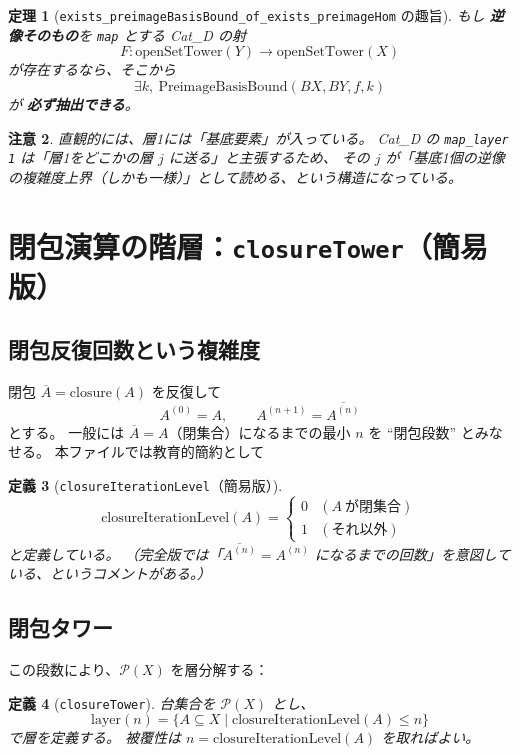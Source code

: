 \documentclass[a4paper,11pt]{article}
\newtheorem{definition}{定義}[section]
\newtheorem{theorem}[definition]{定理}
\newtheorem{remark}[definition]{注意}
\begin{document}
\begin{theorem}[\texttt{exists\_preimageBasisBound\_of\_exists\_preimageHom} の趣旨]
もし \textbf{逆像そのもの}を \texttt{map} とする Cat\_D の射
\[
F:\mathrm{openSetTower}(Y)\to \mathrm{openSetTower}(X)
\]
が存在するなら、そこから
\[
\exists k,\ \mathrm{PreimageBasisBound}(BX,BY,f,k)
\]
が \textbf{必ず抽出できる}。
\end{theorem}

\begin{remark}
直観的には、層1には「基底要素」が入っている。
Cat\_D の \texttt{map\_layer 1} は「層1をどこかの層 $j$ に送る」と主張するため、
その $j$ が「基底1個の逆像の複雑度上界（しかも一様）」として読める、という構造になっている。
\end{remark}

\section{閉包演算の階層：\texttt{closureTower}（簡易版）}

\subsection{閉包反復回数という複雑度}
閉包 $\overline{A}=\mathrm{closure}(A)$ を反復して
\[
A^{(0)}=A,\qquad A^{(n+1)}=\overline{A^{(n)}}
\]
とする。
一般には $\overline{A}=A$（閉集合）になるまでの最小 $n$ を ``閉包段数'' とみなせる。
本ファイルでは教育的簡約として

\begin{definition}[\texttt{closureIterationLevel}（簡易版）]
\[
\mathrm{closureIterationLevel}(A)=
\begin{cases}
0 & (A\ \text{が閉集合})\\
1 & (\text{それ以外})
\end{cases}
\]
と定義している。
（完全版では「$\overline{A^{(n)}}=A^{(n)}$ になるまでの回数」を意図している、というコメントがある。）
\end{definition}

\subsection{閉包タワー}
この段数により、$\mathcal{P}(X)$ を層分解する：

\begin{definition}[\texttt{closureTower}]
台集合を $\mathcal{P}(X)$ とし、
\[
\mathrm{layer}(n)=\{A\subseteq X\mid \mathrm{closureIterationLevel}(A)\le n\}
\]
で層を定義する。
被覆性は $n=\mathrm{closureIterationLevel}(A)$ を取ればよい。
\end{definition}
\end{document}
